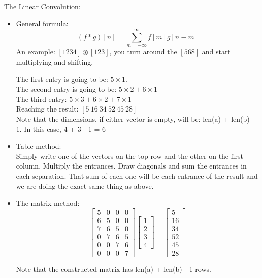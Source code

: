 \documentclass[12pt, a4paper]{article}
\begin{document}
\uline{The Linear Convolution}:
\begin{itemize}
    \item General formula:
    \begin{equation}
        (f*g)[n]=\sum _{m=-\infty }^{\infty}f[m]g[n-m]
    \end{equation} 
    An example:
    $[1 2 3 4] \circledast [1 2 3]$, you turn around the $[5 6 8]$ and start multiplying and shifting. 
    
    The first entry is going to be: $5\times 1$. \\
    The second entry is going to be: $5\times 2 + 6\times 1$ \\
    The third entry: $5 \times 3 + 6 \times 2 + 7 \times 1$ \\
    Reaching the result: $[5 \ 16 \ 34 \ 52 \ 45 \ 28]$ \\
    Note that the dimensions, if either vector is empty, will be: len(a) + len(b) - 1. In this case, 4 + 3 - 1 = 6

    \item Table method:\\
    Simply write one of the vectors on the top row and the other on the first column. Multiply the entrances. Draw diagonals and sum the entrances in each separation. That sum of each one will be each entrance of the result and we are doing the exact same thing as above.

    
    \item The matrix method:
    \begin{equation}
        \begin{bmatrix}
            5 & 0 & 0 & 0 \\
            6 & 5 & 0 & 0 \\
            7 & 6 & 5 & 0 \\
            0 & 7 & 6 & 5 \\
            0 & 0 & 7 & 6 \\
            0 & 0 & 0 & 7
        \end{bmatrix}
        \begin{bmatrix}
            1 \\ 2 \\ 3 \\ 4
        \end{bmatrix}
        = 
        \begin{bmatrix}
            5 \\ 16 \\ 34 \\ 52 \\ 45 \\ 28
        \end{bmatrix}
    \end{equation}
    
    Note that the constructed matrix has len(a) + len(b) - 1 rows.
\end{itemize}
\end{document}
